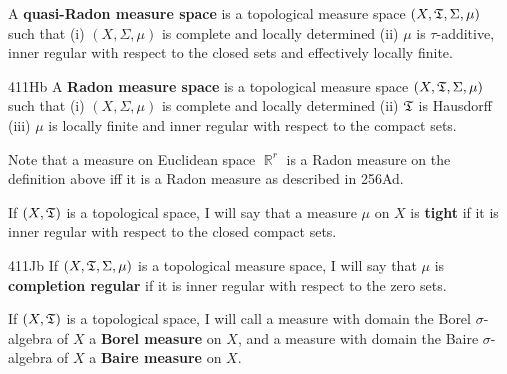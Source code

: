  A {\bf quasi-Radon measure space} is a
topological measure space $(X,\frak T,\Sigma,\mu)$ such that (i)
$(X,\Sigma,\mu)$ is complete and locally determined (ii) $\mu$ is
$\tau$-additive, inner regular with respect to the closed sets and
effectively locally finite.

\spheader 411Hb  A {\bf Radon measure space} is a
topological measure space $(X,\frak T,\Sigma,\mu)$ such that (i)
$(X,\Sigma,\mu)$ is
complete and locally determined (ii) $\frak T$ is Hausdorff (iii) $\mu$
is locally finite and inner regular with respect to the compact sets.

 Note that a measure on Euclidean space $\BbbR^r$ is a
Radon measure on the definition above iff it is a Radon measure as
described in 256Ad.   %

 If $(X,\frak T)$ is a topological space,
I will say that a measure $\mu$ on $X$ is {\bf tight} if it is inner
regular with respect to the closed compact sets.

\spheader 411Jb If $(X,\frak T,\Sigma,\mu)$ is a topological
measure space, I will say that $\mu$ is {\bf completion regular} if it
is inner regular with respect to the zero sets.

If $(X,\frak T)$ is a topological space, I will call a measure with
domain the Borel $\sigma$-algebra of
$X$ a {\bf Borel measure}
on $X$, and a measure with domain the Baire
$\sigma$-algebra of $X$ a {\bf Baire measure} on $X$.

